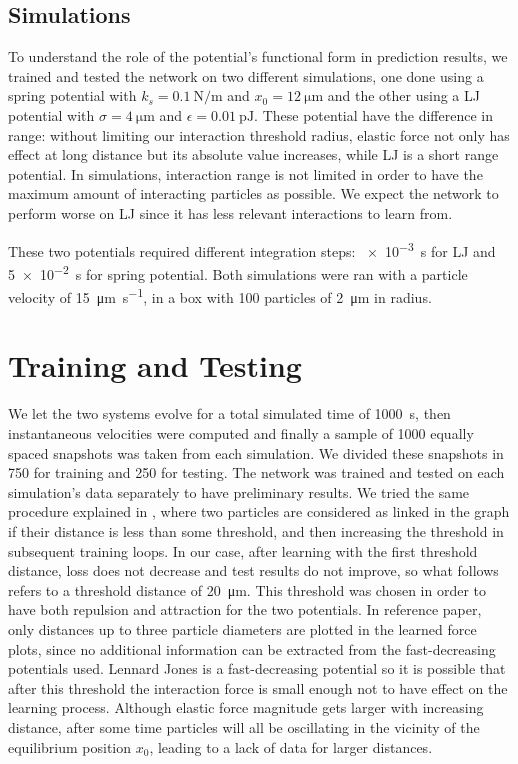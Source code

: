 \documentclass[../../master_thesis_np.tex]{subfiles}
\begin{document}
\subsection{Simulations}
To understand the role of the potential's functional form in prediction results, we trained and tested the network on two different simulations, one done using a spring potential with $k_s = \SI{0.1}{\newton\per\meter}$ and $x_0 = \SI{12}{\um}$ and the other using a LJ potential with $\sigma = \SI{4}{\um}$ and $\epsilon = \SI{0.01}{\pico\joule}$.
These potential have the difference in range: without limiting our interaction threshold radius, elastic force not only has effect at long distance but its absolute value increases, while LJ is a short range potential.
In simulations, interaction range is not limited in order to have the maximum amount of interacting particles as possible.
We expect the network to perform worse on LJ since it has less relevant interactions to learn from.

These two potentials required different integration steps: \SI{e-3}{\second} for LJ and \SI{5e-2}{\second} for spring potential.
Both simulations were ran with a particle velocity of \SI{15}{\um \per \second}, in a  box with \num{100} particles of \SI{2}{\um} in radius.

\section{Training and Testing}

We let the two systems evolve for a total simulated time of \SI{1000}{\second}, then instantaneous velocities were computed and finally a sample of \num{1000} equally spaced snapshots was taken from each simulation.
We divided these snapshots in \num{750} for training and \num{250} for testing.
The network was trained and tested on each simulation's data separately to have preliminary results.
We tried the same procedure explained in \cite{ruiz-garcia_discovering_2024}, where two particles are considered as linked in the graph if their distance is less than some threshold, and then increasing the threshold in subsequent training loops.
In our case, after learning with the first threshold distance, loss does not decrease and test results do not improve, so what follows refers to a threshold distance of \SI{20}{\um}.
This threshold was chosen in order to have both repulsion and attraction for the two potentials.
In reference paper, only distances up to three particle diameters are plotted in the learned force plots, since no additional information can be extracted from the fast-decreasing potentials \citeauthor{ruiz-garcia_discovering_2024} used.
Lennard Jones is a fast-decreasing potential so it is possible that after this threshold the interaction force is small enough not to have effect on the learning process.
Although elastic force magnitude gets larger with increasing distance, after some time particles will all be oscillating in the vicinity of the equilibrium position $x_0$, leading to a lack of data for larger distances.
\end{document}
